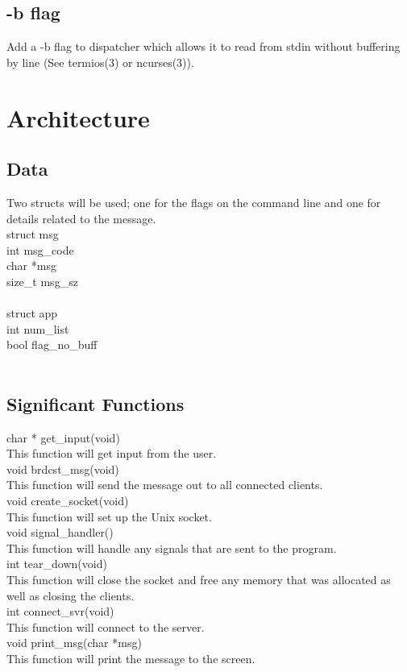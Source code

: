 \documentclass{article}
\begin{document}
  \subsection*{-b flag}
  Add a -b flag to dispatcher which allows it to read from stdin without buffering
  by line (See termios(3) or ncurses(3)).

  \section*{Architecture}
  \subsection*{Data}
Two structs will be used; one for the flags on the command line and one for details related to the message.\\
struct msg{\\
\qquad \indent int msg\_code\\
\qquad \indent char *msg\\
\qquad \indent size\_t msg\_sz\\
}\\
struct app{\\
\qquad \indent int num\_list\\
\qquad \indent bool flag\_no\_buff\\
}\\
  \subsection*{Significant Functions}
  char * get\_input(void)\\
  \qquad \indent This function will get input from the user.\\
  void brdcst\_msg(void)\\
  \qquad \indent This function will send the message out to all connected clients.\\
  void create\_socket(void)\\
  \qquad \indent This function will set up the Unix socket.\\
  void signal\_handler()\\
  \qquad \indent This function will handle any signals that are sent to the program.\\
  int tear\_down(void)\\
  \qquad \indent This function will close the socket and free any memory that was allocated as well as closing
  the clients.\\
  int connect\_svr(void)\\
  \qquad \indent This function will connect to the server.\\
  void print\_msg(char *msg)\\
  \qquad \indent This function will print the message to the screen.\\
\end{document}
